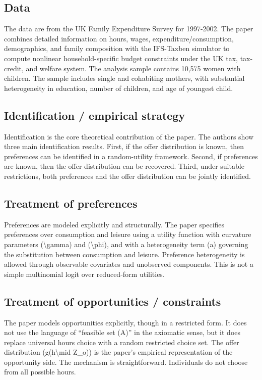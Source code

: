 \documentclass[11pt,a4paper]{article}
\begin{document}
\subsection*{Data}
The data are from the UK Family Expenditure Survey for 1997-2002. The paper combines detailed information on hours, wages, expenditure/consumption, demographics, and family composition with the IFS-Taxben simulator to compute nonlinear household-specific budget constraints under the UK tax, tax-credit, and welfare system. The analysis sample contains 10,575 women with children. The sample includes single and cohabiting mothers, with substantial heterogeneity in education, number of children, and age of youngest child.

\subsection*{Identification / empirical strategy}
Identification is the core theoretical contribution of the paper. The authors show three main identification results. First, if the offer distribution is known, then preferences can be identified in a random-utility framework. Second, if preferences are known, then the offer distribution can be recovered. Third, under suitable restrictions, both preferences and the offer distribution can be jointly identified.

\subsection*{Treatment of preferences}
Preferences are modeled explicitly and structurally. The paper specifies preferences over consumption and leisure using a utility function with curvature parameters (\textbackslash{}gamma) and (\textbackslash{}phi), and with a heterogeneity term (a) governing the substitution between consumption and leisure. Preference heterogeneity is allowed through observable covariates and unobserved components. This is not a simple multinomial logit over reduced-form utilities.

\subsection*{Treatment of opportunities / constraints}
The paper models opportunities explicitly, though in a restricted form. It does not use the language of “feasible set (A)” in the axiomatic sense, but it does replace universal hours choice with a random restricted choice set. The offer distribution (g(h\textbackslash{}mid Z\_o)) is the paper’s empirical representation of the opportunity side. The mechanism is straightforward. Individuals do not choose from all possible hours.
\end{document}
